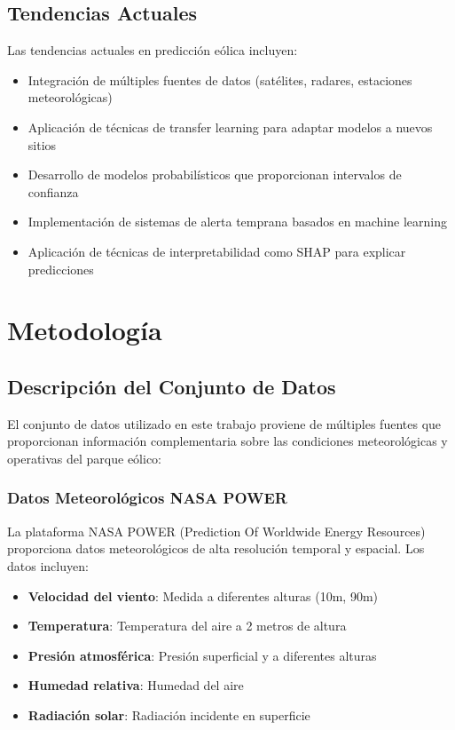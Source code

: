 \documentclass[conference]{IEEEtran}
\begin{document}
	\subsection{Tendencias Actuales}
	Las tendencias actuales en predicción eólica incluyen:
	\begin{itemize}
		\item Integración de múltiples fuentes de datos (satélites, radares, estaciones meteorológicas)
		\item Aplicación de técnicas de transfer learning para adaptar modelos a nuevos sitios
		\item Desarrollo de modelos probabilísticos que proporcionan intervalos de confianza
		\item Implementación de sistemas de alerta temprana basados en machine learning
		\item Aplicación de técnicas de interpretabilidad como SHAP para explicar predicciones
	\end{itemize}
	
	\section{Metodología}
	
	\subsection{Descripción del Conjunto de Datos}
	El conjunto de datos utilizado en este trabajo proviene de múltiples fuentes que proporcionan información complementaria sobre las condiciones meteorológicas y operativas del parque eólico:
	
	\subsubsection{Datos Meteorológicos NASA POWER}
	La plataforma NASA POWER (Prediction Of Worldwide Energy Resources) proporciona datos meteorológicos de alta resolución temporal y espacial. Los datos incluyen:
	\begin{itemize}
		\item \textbf{Velocidad del viento}: Medida a diferentes alturas (10m, 90m)
		\item \textbf{Temperatura}: Temperatura del aire a 2 metros de altura
		\item \textbf{Presión atmosférica}: Presión superficial y a diferentes alturas
		\item \textbf{Humedad relativa}: Humedad del aire
		\item \textbf{Radiación solar}: Radiación incidente en superficie
	\end{itemize}
	
\end{document}
